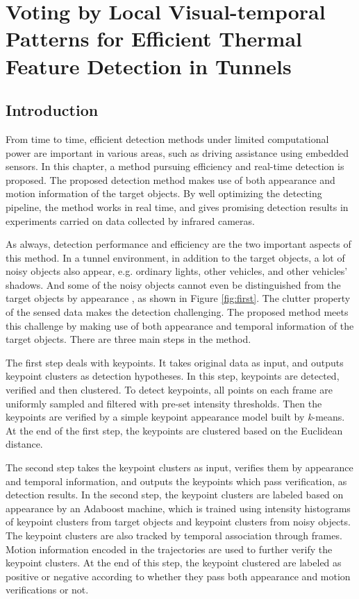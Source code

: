 \chapter{Voting by Local Visual-temporal Patterns for Efficient Thermal Feature Detection in Tunnels}
\label{chp3}

\section{Introduction}

From time to time, efficient detection methods under limited computational power are important in various areas, such as driving assistance using embedded sensors. In this chapter, a method pursuing efficiency and real-time detection is proposed.
The proposed detection method makes use of both
appearance and motion information of the target objects. By well optimizing the detecting pipeline, the
method works in real time, and gives promising detection results in experiments  carried on data collected by infrared cameras.

As always, detection performance and efficiency are the two important aspects of this method.
In a tunnel environment, in addition to the target objects, a lot of noisy objects also appear, e.g. ordinary lights, other vehicles, and other vehicles' shadows. And some of the noisy objects cannot even be distinguished from the target objects by appearance , as shown in Figure \ref{fig:first}. The clutter property of the sensed data makes the detection challenging.
The proposed method meets this challenge by making use of both appearance and temporal information of the target objects. 
There are three main steps in the method. 

The first step deals with keypoints. It takes original data as input, and outputs keypoint clusters as detection hypotheses. In this step, keypoints are detected, verified and then clustered. To detect keypoints, all points on each frame are uniformly sampled and filtered with pre-set intensity thresholds.  Then the keypoints are verified by a simple keypoint appearance model   built by \emph{k}-means. At the end of the first step, the keypoints are clustered based on the Euclidean distance. 

The second step takes the keypoint clusters as input, verifies them by appearance and temporal information, and outputs the keypoints which pass verification, as detection results. In the second step, the keypoint clusters are labeled based on appearance by an Adaboost machine, which is trained using intensity histograms of keypoint clusters from target objects and keypoint clusters from noisy objects. The keypoint clusters are also tracked by temporal association through frames. Motion information encoded in the trajectories are used to further verify the keypoint clusters. At the end of this step, the keypoint clustered are labeled as positive or negative according to whether they pass both appearance and motion verifications or not.

